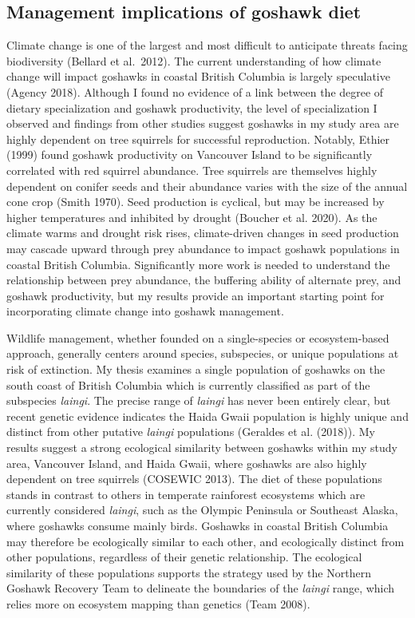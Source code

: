 \documentclass{sfuthesis}
\begin{document}
\hypertarget{management-implications-of-goshawk-diet}{%
\subsection{Management implications of goshawk diet}\label{management-implications-of-goshawk-diet}}

Climate change is one of the largest and most difficult to anticipate threats facing biodiversity (Bellard et al.~2012). The current understanding of how climate change will impact goshawks in coastal British Columbia is largely speculative (Agency 2018). Although I found no evidence of a link between the degree of dietary specialization and goshawk productivity, the level of specialization I observed and findings from other studies suggest goshawks in my study area are highly dependent on tree squirrels for successful reproduction. Notably, Ethier (1999) found goshawk productivity on Vancouver Island to be significantly correlated with red squirrel abundance. Tree squirrels are themselves highly dependent on conifer seeds and their abundance varies with the size of the annual cone crop (Smith 1970). Seed production is cyclical, but may be increased by higher temperatures and inhibited by drought (Boucher et al. 2020). As the climate warms and drought risk rises, climate-driven changes in seed production may cascade upward through prey abundance to impact goshawk populations in coastal British Columbia. Significantly more work is needed to understand the relationship between prey abundance, the buffering ability of alternate prey, and goshawk productivity, but my results provide an important starting point for incorporating climate change into goshawk management.

Wildlife management, whether founded on a single-species or ecosystem-based approach, generally centers around species, subspecies, or unique populations at risk of extinction. My thesis examines a single population of goshawks on the south coast of British Columbia which is currently classified as part of the subspecies \emph{laingi}. The precise range of \emph{laingi} has never been entirely clear, but recent genetic evidence indicates the Haida Gwaii population is highly unique and distinct from other putative \emph{laingi} populations (Geraldes et al. (2018)). My results suggest a strong ecological similarity between goshawks within my study area, Vancouver Island, and Haida Gwaii, where goshawks are also highly dependent on tree squirrels (COSEWIC 2013). The diet of these populations stands in contrast to others in temperate rainforest ecosystems which are currently considered \emph{laingi}, such as the Olympic Peninsula or Southeast Alaska, where goshawks consume mainly birds. Goshawks in coastal British Columbia may therefore be ecologically similar to each other, and ecologically distinct from other populations, regardless of their genetic relationship. The ecological similarity of these populations supports the strategy used by the Northern Goshawk Recovery Team to delineate the boundaries of the \emph{laingi} range, which relies more on ecosystem mapping than genetics (Team 2008).
\end{document}
